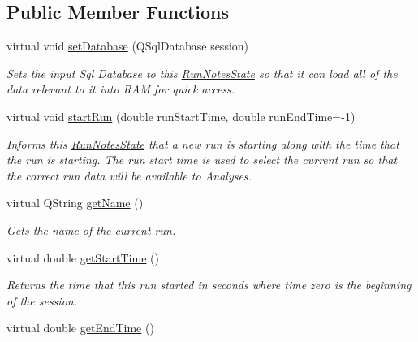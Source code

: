 \subsection*{Public Member Functions}
\begin{DoxyCompactItemize}
\item 
\hypertarget{class_picto_1_1_run_notes_state_afb6539ae286fcd84331e170e2a17f3b2}{virtual void \hyperlink{class_picto_1_1_run_notes_state_afb6539ae286fcd84331e170e2a17f3b2}{set\-Database} (Q\-Sql\-Database session)}\label{class_picto_1_1_run_notes_state_afb6539ae286fcd84331e170e2a17f3b2}

\begin{DoxyCompactList}\small\item\em Sets the input Sql Database to this \hyperlink{class_picto_1_1_run_notes_state}{Run\-Notes\-State} so that it can load all of the data relevant to it into R\-A\-M for quick access. \end{DoxyCompactList}\item 
\hypertarget{class_picto_1_1_run_notes_state_a6dbd7e783e02c13186b96712401ffc11}{virtual void \hyperlink{class_picto_1_1_run_notes_state_a6dbd7e783e02c13186b96712401ffc11}{start\-Run} (double run\-Start\-Time, double run\-End\-Time=-\/1)}\label{class_picto_1_1_run_notes_state_a6dbd7e783e02c13186b96712401ffc11}

\begin{DoxyCompactList}\small\item\em Informs this \hyperlink{class_picto_1_1_run_notes_state}{Run\-Notes\-State} that a new run is starting along with the time that the run is starting. The run start time is used to select the current run so that the correct run data will be available to Analyses. \end{DoxyCompactList}\item 
virtual Q\-String \hyperlink{class_picto_1_1_run_notes_state_aaf555f4d511914d7659cb74dec2a24af}{get\-Name} ()
\begin{DoxyCompactList}\small\item\em Gets the name of the current run. \end{DoxyCompactList}\item 
\hypertarget{class_picto_1_1_run_notes_state_a7468c4ab93b4a0a094d49e78103937d7}{virtual double \hyperlink{class_picto_1_1_run_notes_state_a7468c4ab93b4a0a094d49e78103937d7}{get\-Start\-Time} ()}\label{class_picto_1_1_run_notes_state_a7468c4ab93b4a0a094d49e78103937d7}

\begin{DoxyCompactList}\small\item\em Returns the time that this run started in seconds where time zero is the beginning of the session. \end{DoxyCompactList}\item 
\hypertarget{class_picto_1_1_run_notes_state_ac727408a933143d65da2632b713d365d}{virtual double \hyperlink{class_picto_1_1_run_notes_state_ac727408a933143d65da2632b713d365d}{get\-End\-Time} ()}\label{class_picto_1_1_run_notes_state_ac727408a933143d65da2632b713d365d}


\end{DoxyCompactItemize}
